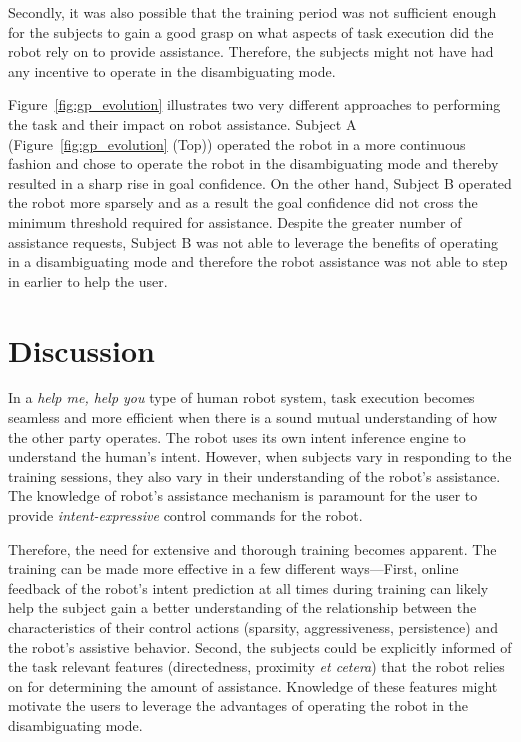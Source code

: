 Secondly, it was also possible that the training period was not sufficient enough for the subjects to gain a good grasp on what aspects of task execution did the robot rely on to provide assistance. Therefore, the subjects might not have had any incentive to operate in the disambiguating mode.
 
Figure~\ref{fig:gp_evolution} illustrates two very different approaches to performing the task and their impact on robot assistance. 
Subject A (Figure~\ref{fig:gp_evolution} (Top)) operated the robot in a more continuous fashion and chose to operate the robot in the disambiguating mode and thereby resulted in a sharp rise in goal confidence. On the other hand, Subject B operated the robot more sparsely and as a result the goal confidence did not cross the minimum threshold required for assistance. Despite the greater number of assistance requests, Subject B was not able to leverage the benefits of operating in a disambiguating mode and therefore the robot assistance was not able to step in earlier to help the user. 

%
\section{Discussion}\label{sec:discussions}
 
 
 In a \textit{help me, help you} type of human robot system, task execution becomes seamless and more efficient when there is a sound mutual understanding of how the other party operates. The robot uses its own intent inference engine to understand the human's intent. However, when subjects vary in responding to the training sessions, they also vary in their understanding of the robot's assistance. The knowledge of robot's assistance mechanism is paramount for the user to provide \textit{intent-expressive} control commands for the robot. 
 
 Therefore, the need for extensive and thorough training becomes apparent.
 The training can be made more effective in a few different ways---First, online feedback of the robot's intent prediction at all times during training can likely help the subject gain a better understanding of the relationship between the characteristics of their control actions (sparsity, aggressiveness, persistence) and the robot's assistive behavior. Second, the subjects could be explicitly informed of the task relevant features (directedness, proximity \textit{et cetera}) that the robot relies on for determining the amount of assistance. Knowledge of these features might motivate the users to leverage the advantages of operating the robot in the disambiguating mode. 
 
